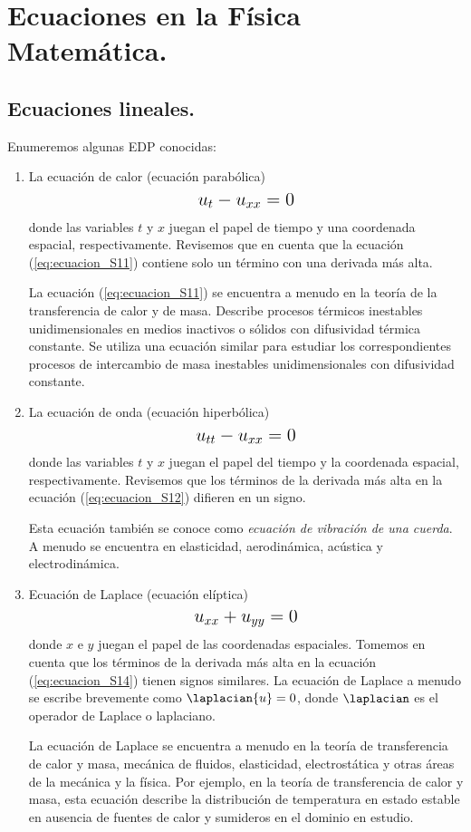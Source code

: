 \section{Ecuaciones en la Física Matemática.}

\subsection{Ecuaciones lineales.}
Enumeremos algunas EDP conocidas:
\begin{enumerate}
    \item La ecuación de calor (ecuación parabólica)
\begin{align}
\text{\Large{$u_{t} - u_{xx} = 0$}}
\label{eq:ecuacion_S11}
\end{align}
donde las variables $t$ y $x$ juegan el papel de tiempo y una coordenada espacial, respectivamente. Revisemos que  en cuenta que la ecuación (\ref{eq:ecuacion_S11}) contiene solo un término con una derivada más alta.
\par
La ecuación (\ref{eq:ecuacion_S11}) se encuentra a menudo en la teoría de la transferencia de calor y de masa. Describe procesos térmicos inestables unidimensionales en medios inactivos o sólidos con difusividad térmica constante. Se utiliza una ecuación similar para estudiar los correspondientes procesos de intercambio de masa inestables unidimensionales con difusividad constante.
\item La ecuación de onda (ecuación hiperbólica)
\begin{align}
\text{\Large{$u_{tt} - u_{xx} = 0$}}
\label{eq:ecuacion_S12}
\end{align}
donde las variables $t$ y $x$ juegan el papel del tiempo y la coordenada espacial, respectivamente. Revisemos que los términos de la derivada más alta en la ecuación (\ref{eq:ecuacion_S12}) difieren en un signo.
\par
Esta ecuación también se conoce como \emph{ecuación de vibración de una cuerda}. A menudo se encuentra en elasticidad, aerodinámica, acústica y electrodinámica.
\item Ecuación de Laplace (ecuación elíptica)
\begin{align}
\text{\Large{$u_{xx} + u_{yy} = 0$}}
\label{eq:ecuacion_S14}
\end{align}
donde $x$ e $y$ juegan el papel de las coordenadas espaciales. Tomemos en cuenta que los términos de la derivada más alta en la ecuación (\ref{eq:ecuacion_S14}) tienen signos similares. La ecuación de Laplace a menudo se escribe brevemente como $\laplacian{u} = 0$, donde $\laplacian$ es el operador de Laplace o laplaciano.
\par
La ecuación de Laplace se encuentra a menudo en la teoría de transferencia de calor y masa, mecánica de fluidos, elasticidad, electrostática y otras áreas de la mecánica y la física. Por ejemplo, en la teoría de transferencia de calor y masa, esta ecuación describe la distribución de temperatura en estado estable en ausencia de fuentes de calor y sumideros en el dominio en estudio.
\end{enumerate}
